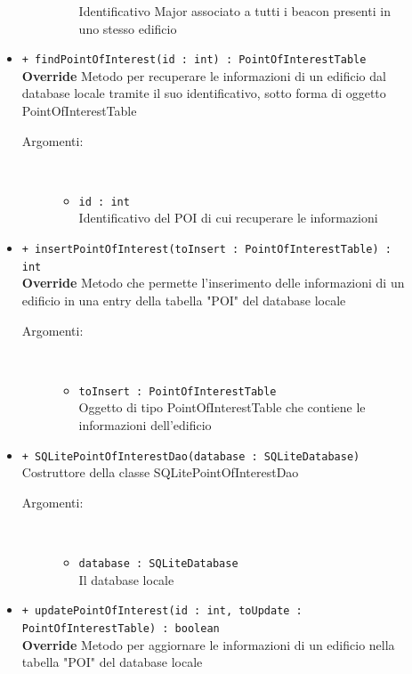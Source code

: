 \documentclass[../DefinizioneDiProdotto.tex]{subfiles}
\begin{document}
\begin{description}
\begin{itemize}
\begin{description}
\begin{itemize}
Identificativo Major associato a tutti i beacon presenti in uno stesso edificio\end{itemize}
\end{description}
\item \texttt{+ findPointOfInterest(id : int) : PointOfInterestTable}\\
\textbf{Override} Metodo per recuperare le informazioni di un edificio dal database locale tramite il suo identificativo, sotto forma di oggetto PointOfInterestTable
 \begin{description}
\item[Argomenti:] \
\begin{itemize}
\item \texttt{id : int}\\
Identificativo del POI di cui recuperare le informazioni\end{itemize}
\end{description}
\item \texttt{+ insertPointOfInterest(toInsert : PointOfInterestTable) : int}\\
\textbf{Override} Metodo che permette l'inserimento delle informazioni di un edificio in una entry della tabella "POI" del database locale
 \begin{description}
\item[Argomenti:] \
\begin{itemize}
\item \texttt{toInsert : PointOfInterestTable}\\
Oggetto di tipo PointOfInterestTable che contiene le informazioni dell'edificio\end{itemize}
\end{description}
\item \texttt{+ SQLitePointOfInterestDao(database : SQLiteDatabase)}\\
Costruttore della classe SQLitePointOfInterestDao
 \begin{description}
\item[Argomenti:] \
\begin{itemize}
\item \texttt{database : SQLiteDatabase}\\
Il database locale\end{itemize}
\end{description}
\item \texttt{+ updatePointOfInterest(id : int, toUpdate : PointOfInterestTable) : boolean}\\
\textbf{Override} Metodo per aggiornare le informazioni di un edificio nella tabella "POI" del database locale

\end{itemize}
\end{description}
\end{document}
